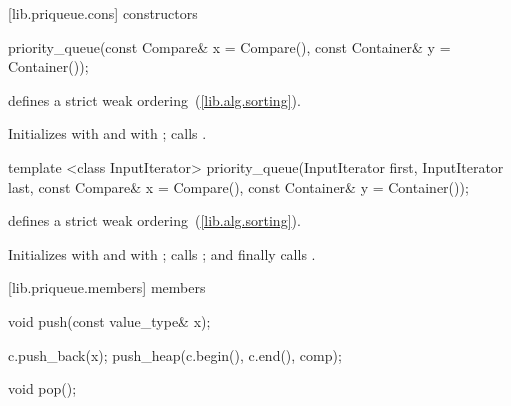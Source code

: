 [lib.priqueue.cons]{ constructors}

%
\begin{itemdecl}
priority_queue(const Compare& x = Compare(),
               const Container& y = Container());
\end{itemdecl}

\begin{itemdescr}
\pnum
\requires
{} defines a strict weak ordering~(\ref{lib.alg.sorting}).

\pnum
\effects
Initializes
 with
 and
 with
;
calls
.
\end{itemdescr}

%
\begin{itemdecl}
template <class InputIterator>
  priority_queue(InputIterator first, InputIterator last,
                 const Compare& x = Compare(),
                 const Container& y = Container());
\end{itemdecl}

\begin{itemdescr}
\pnum
\requires
{} defines a strict weak ordering~(\ref{lib.alg.sorting}).

\pnum
\effects
Initializes
 with
 and
 with
;
calls
;
and finally calls
.
\end{itemdescr}

[lib.priqueue.members]{ members}

%
\begin{itemdecl}
void push(const value_type& x);
\end{itemdecl}

\begin{itemdescr}
\pnum
\effects
\begin{codeblock}
        c.push_back(x);
        push_heap(c.begin(), c.end(), comp);
\end{codeblock}
\end{itemdescr}

%
\begin{itemdecl}
void pop();
\end{itemdecl}


